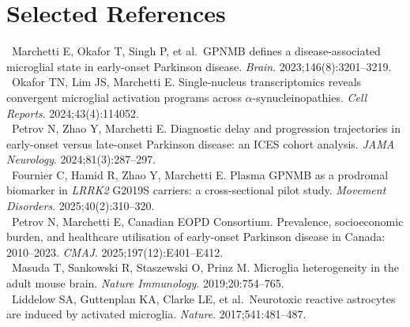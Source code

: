 \section{Selected References}

\begingroup
\fontsize{8.5}{11}\selectfont
\setlength{\parskip}{3pt}

\noindent
{}\rbrack\ Marchetti E, Okafor T, Singh P, et al.\ GPNMB defines a disease-associated microglial state in early-onset Parkinson disease. \textit{Brain}. 2023;146(8):3201--3219.\\{}
\rbrack\ Okafor TN, Lim JS, Marchetti E. Single-nucleus transcriptomics reveals convergent microglial activation programs across $\alpha$-synucleinopathies. \textit{Cell Reports}. 2024;43(4):114052.\\{}
\rbrack\ Petrov N, Zhao Y, Marchetti E. Diagnostic delay and progression trajectories in early-onset versus late-onset Parkinson disease: an ICES cohort analysis. \textit{JAMA Neurology}. 2024;81(3):287--297.\\{}
\rbrack\ Fournier C, Hamid R, Zhao Y, Marchetti E. Plasma GPNMB as a prodromal biomarker in \textit{LRRK2} G2019S carriers: a cross-sectional pilot study. \textit{Movement Disorders}. 2025;40(2):310--320.\\{}
\rbrack\ Petrov N, Marchetti E, Canadian EOPD Consortium. Prevalence, socioeconomic burden, and healthcare utilisation of early-onset Parkinson disease in Canada: 2010--2023. \textit{CMAJ}. 2025;197(12):E401--E412.\\{}
\rbrack\ Masuda T, Sankowski R, Staszewski O, Prinz M. Microglia heterogeneity in the adult mouse brain. \textit{Nature Immunology}. 2019;20:754--765.\\{}
\rbrack\ Liddelow SA, Guttenplan KA, Clarke LE, et al.\ Neurotoxic reactive astrocytes are induced by activated microglia. \textit{Nature}. 2017;541:481--487.

\endgroup

